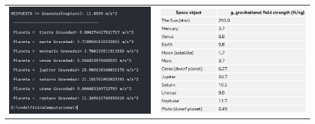 \documentclass[a4paper,12pt]{article}
\begin{document}
        \begin{table}[!htbp]
            \centering
            \begin{tabular}{cc}
                \begin{minipage}{.3\textwidth}
                    \includegraphics[width=\linewidth]{e1_4}
                \end{minipage}
                &
                \begin{minipage}{.3\textwidth}
                    \includegraphics[width=\linewidth]{e1real}
                \end{minipage}
            \end{tabular}
        \end{table}
\end{document}

